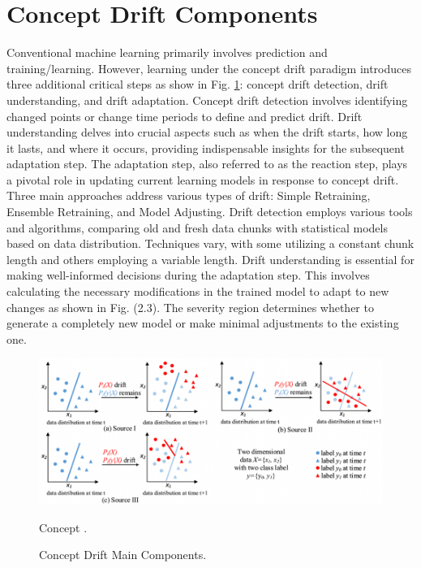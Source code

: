 \section{Concept Drift Components}
\label{sec:background_concept_drift_components}
Conventional machine learning primarily involves prediction and training/learning. However, learning under the concept drift paradigm introduces three additional critical steps as show in Fig. \ref{fig:concept-drift-components}: concept drift detection, drift understanding, and drift adaptation. Concept drift detection involves identifying changed points or change time periods to define and predict drift. Drift understanding delves into crucial aspects such as when the drift starts, how long it lasts, and where it occurs, providing indispensable insights for the subsequent adaptation step.  
The adaptation step, also referred to as the reaction step, plays a pivotal role in updating current learning models in response to concept drift. Three main approaches address various types of drift: Simple Retraining, Ensemble Retraining, and Model Adjusting. Drift detection employs various tools and algorithms, comparing old and fresh data chunks with statistical models based on data distribution. Techniques vary, with some utilizing a constant chunk length and others employing a variable length.
Drift understanding is essential for making well-informed decisions during the adaptation step. This involves calculating the necessary modifications in the trained model to adapt to new changes as shown in Fig. (2.3). The severity region determines whether to generate a completely new model or make minimal adjustments to the existing one.

 
\begin{figure}[!ht]
    \centering
    \includegraphics[width=.9\textwidth]{2_Background/figures/concept_drift_sources.png}
    \caption{Concept .}
    \caption{Concept Drift Main Components.}
    \label{fig:concept-drift-components}
\end{figure}


